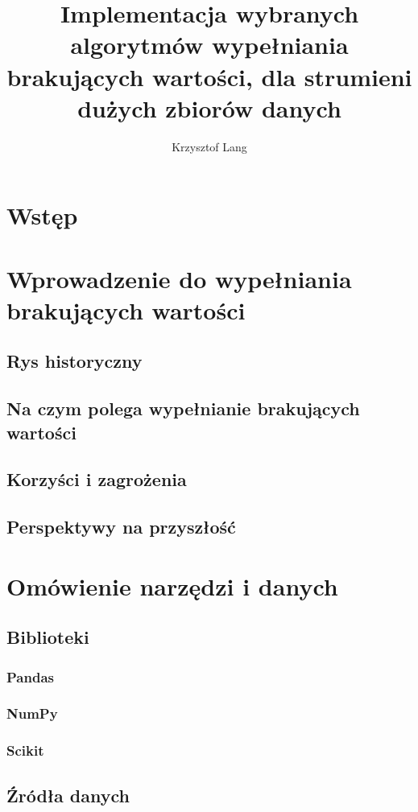 \documentclass[12pt,twoside]{article}
\author{Krzysztof Lang}
\title{Implementacja wybranych algorytmów wypełniania brakujących wartości, dla strumieni dużych zbiorów danych}
\begin{document}
\maketitle

\blankpage

\tableofcontents
\clearpage
\blankpage
\section{Wstęp}
\clearpage
\section{Wprowadzenie do wypełniania brakujących wartości}
\subsection{Rys historyczny}
\subsection{Na czym polega wypełnianie brakujących wartości}
\subsection{Korzyści i zagrożenia}
\subsection{Perspektywy na przyszłość}
\clearpage
\section{Omówienie narzędzi i danych}
\subsection{Biblioteki}
\subsubsection{Pandas}
\subsubsection{NumPy}
\subsubsection{Scikit}
\subsection{Źródła danych}
\end{document}
